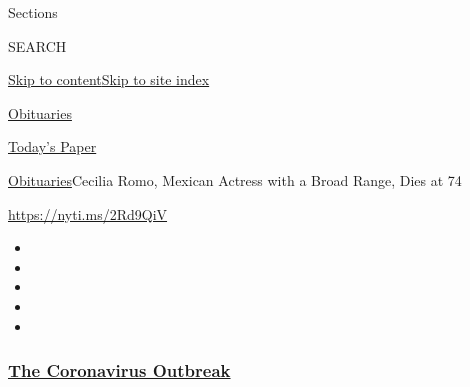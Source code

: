 Sections

SEARCH

\protect\hyperlink{site-content}{Skip to
content}\protect\hyperlink{site-index}{Skip to site index}

\href{https://www.nytimes3xbfgragh.onion/section/obituaries}{Obituaries}

\href{https://myaccount.nytimes3xbfgragh.onion/auth/login?response_type=cookie\&client_id=vi}{}

\href{https://www.nytimes3xbfgragh.onion/section/todayspaper}{Today's
Paper}

\href{/section/obituaries}{Obituaries}\textbar{}Cecilia Romo, Mexican
Actress with a Broad Range, Dies at 74

\url{https://nyti.ms/2Rd9QiV}

\begin{itemize}
\item
\item
\item
\item
\item
\end{itemize}

\hypertarget{the-coronavirus-outbreak}{%
\subsubsection{\texorpdfstring{\href{https://www.nytimes3xbfgragh.onion/news-event/coronavirus?name=promo-coronavirus-obits\&region=TOP_BANNER\&block=storyline_menu_recirc\&action=click\&pgtype=Article\&impression_id=bc676e90-f52d-11ea-9ef0-65b6da73d0be\&variant=undefined}{The
Coronavirus
Outbreak}}{The Coronavirus Outbreak}}\label{the-coronavirus-outbreak}}

